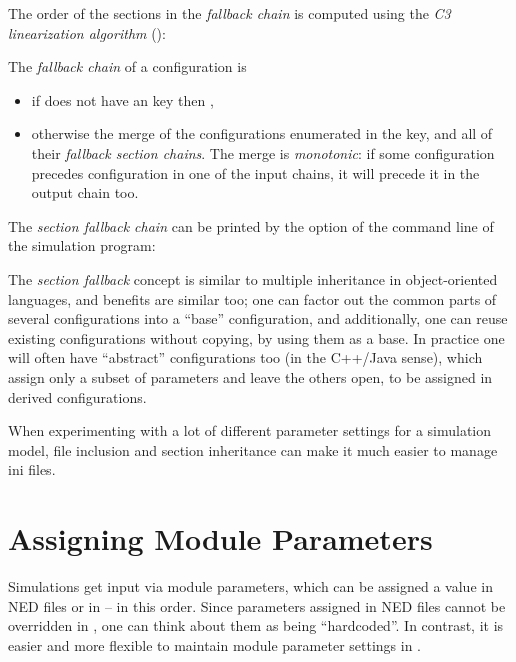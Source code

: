The order of the sections in the \textit{fallback chain} is computed
using the \textit{C3 linearization algorithm} (\cite{Barrett1996}):

The \textit{fallback chain} of a configuration  is
\begin{itemize}
  \item if  does not have an  key then
        , 
  \item otherwise the merge of the configurations enumerated in the
         key, and all of their \textit{fallback section chains}.
        The merge is \textit{monotonic}: if some configuration 
        precedes configuration  in one of the input chains,
        it will precede it in the output chain too.
\end{itemize}

The \textit{section fallback chain} can be printed by the  option
of the command line of the simulation program:


The \textit{section fallback} concept is similar to multiple inheritance in
object-oriented languages, and benefits are similar too; one can factor out
the common parts of several configurations into a ``base'' configuration,
and additionally, one can reuse existing configurations without copying, by
using them as a base. In practice one will often have ``abstract''
configurations too (in the C++/Java sense), which assign only a subset of
parameters and leave the others open, to be assigned in derived
configurations.

When experimenting with a lot of different parameter settings for a
simulation model, file inclusion and section inheritance can make it much
easier to manage ini files.


\section{Assigning Module Parameters}
\label{sec:config-sim:parameter-settings}

Simulations get input via module parameters, which can be assigned a
value in NED files or in  -- in this order. Since parameters
assigned in NED files cannot be overridden in , one can
think about them as being ``hardcoded''. In contrast, it is easier
and more flexible to maintain module parameter settings in .

